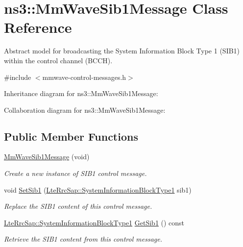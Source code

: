 \hypertarget{classns3_1_1MmWaveSib1Message}{}\section{ns3\+:\+:Mm\+Wave\+Sib1\+Message Class Reference}
\label{classns3_1_1MmWaveSib1Message}


Abstract model for broadcasting the System Information Block Type 1 (S\+I\+B1) within the control channel (B\+C\+CH).  




{\ttfamily \#include $<$mmwave-\/control-\/messages.\+h$>$}



Inheritance diagram for ns3\+:\+:Mm\+Wave\+Sib1\+Message\+:


Collaboration diagram for ns3\+:\+:Mm\+Wave\+Sib1\+Message\+:
\subsection*{Public Member Functions}
\begin{DoxyCompactItemize}
\item 
\hyperlink{classns3_1_1MmWaveSib1Message_a971cd090282f0c93c78e3288dfeaa27d}{Mm\+Wave\+Sib1\+Message} (void)
\begin{DoxyCompactList}\small\item\em Create a new instance of S\+I\+B1 control message. \end{DoxyCompactList}\item 
void \hyperlink{classns3_1_1MmWaveSib1Message_aa7fd031efaba05313ebb238e65307473}{Set\+Sib1} (\hyperlink{structns3_1_1LteRrcSap_1_1SystemInformationBlockType1}{Lte\+Rrc\+Sap\+::\+System\+Information\+Block\+Type1} sib1)
\begin{DoxyCompactList}\small\item\em Replace the S\+I\+B1 content of this control message. \end{DoxyCompactList}\item 
\hyperlink{structns3_1_1LteRrcSap_1_1SystemInformationBlockType1}{Lte\+Rrc\+Sap\+::\+System\+Information\+Block\+Type1} \hyperlink{classns3_1_1MmWaveSib1Message_a0332d5bb814fcc79c6446dff84c90efc}{Get\+Sib1} () const 
\begin{DoxyCompactList}\small\item\em Retrieve the S\+I\+B1 content from this control message. \end{DoxyCompactList}\end{DoxyCompactItemize}
